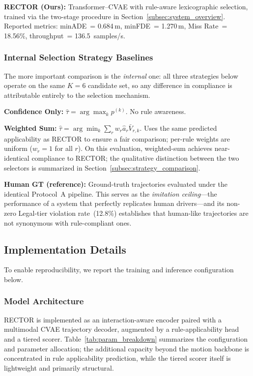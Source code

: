 \textbf{RECTOR (Ours):}  Transformer--CVAE with rule-aware lexicographic selection, trained via the two-stage procedure in Section~\ref{subsec:system_overview}. Reported metrics: minADE~= 0.684\,m, minFDE~= 1.270\,m, Miss Rate~= 18.56\%, throughput~= 136.5~samples/s.

\subsubsection{Internal Selection Strategy Baselines}

The more important comparison is the \emph{internal} one: all three strategies below operate on the same $K{=}6$ candidate set, so any difference in compliance is attributable entirely to the selection mechanism.

\textbf{Confidence Only:}  $\hat{\tau} = \arg\max_k p^{(k)}$.  No rule awareness.

\textbf{Weighted Sum:}  $\hat{\tau} = \arg\min_k \sum_r w_r \hat{a}_r \bar{V}_{r,k}$. Uses the same predicted applicability as RECTOR to ensure a fair comparison; per-rule weights are uniform ($w_r{=}1$ for all $r$). On this evaluation, weighted-sum achieves near-identical compliance to RECTOR; the qualitative distinction between the two selectors is summarized in Section~\ref{subsec:strategy_comparison}.

\textbf{Human GT (reference):}  Ground-truth trajectories evaluated under the identical Protocol~A pipeline.  This serves as the \emph{imitation ceiling}---the performance of a system that perfectly replicates human drivers---and its non-zero Legal-tier violation rate~(12.8\%) establishes that human-like trajectories are not synonymous with rule-compliant ones.

\subsection{Implementation Details}
\label{subsec:implementation}

To enable reproducibility, we report the training and inference configuration below.

\subsubsection{Model Architecture}

RECTOR is implemented as an interaction-aware encoder paired with a multimodal CVAE trajectory decoder, augmented by a rule-applicability head and a tiered scorer. Table~\ref{tab:param_breakdown} summarizes the configuration and parameter allocation; the additional capacity beyond the motion backbone is concentrated in rule applicability prediction, while the tiered scorer itself is lightweight and primarily structural.

